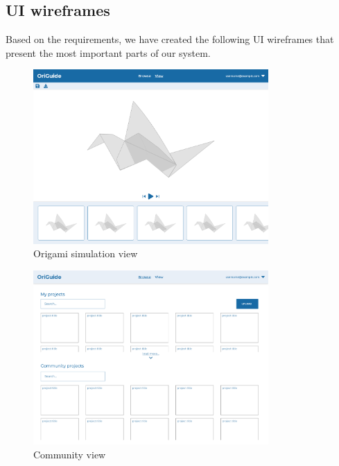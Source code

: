 \begin{enumerate}
\end{enumerate}

\subsection{UI wireframes}

Based on the requirements, we have created the following UI wireframes that
present the most important parts of our system.


\begin{figure}[H]
\caption{Origami simulation view}
  \centering
    \includegraphics[width=0.8\textwidth]{assets/simulator-wireframe.png}
\end{figure}

\begin{figure}[H]
\caption{Community view}
  \centering
    \includegraphics[width=0.8\textwidth]{assets/browser-wireframe.png}
\end{figure}
